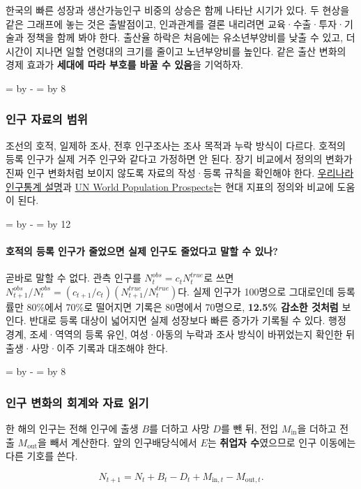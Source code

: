 \documentclass[10pt,a4paper]{article}
\newcommand{\ReserveQuestionSpace}{%
  \par\begingroup
  \dimen0=\pagegoal \advance\dimen0 by -\pagetotal
  \dimen2=\baselineskip \multiply\dimen2 by 12
  \ifdim\dimen0<\dimen2 \newpage\fi
  \endgroup}
\newcommand{\ReserveReadingSectionSpace}{%
  \par\begingroup
  \dimen0=\pagegoal \advance\dimen0 by -\pagetotal
  \dimen2=\baselineskip \multiply\dimen2 by 8
  \ifdim\dimen0<\dimen2 \newpage\fi
  \endgroup}
\begin{document}
한국의 빠른 성장과 생산가능인구 비중의 상승은 함께 나타난 시기가 있다. 두 현상을 같은 그래프에 놓는 것은 출발점이고, 인과관계를 결론 내리려면 교육·수출·투자·기술과 정책을 함께 봐야 한다. 출산율 하락은 처음에는 유소년부양비를 낮출 수 있고, 더 시간이 지나면 일할 연령대의 크기를 줄이고 노년부양비를 높인다. 같은 출산 변화의 경제 효과가 \textbf{세대에 따라 부호를 바꿀 수 있음}을 기억하자.\par

\ReserveReadingSectionSpace
\subsubsection*{인구 자료의 범위}

조선의 호적, 일제하 조사, 전후 인구조사는 조사 목적과 누락 방식이 다르다. 호적의 등록 인구가 실제 거주 인구와 같다고 가정하면 안 된다. 장기 비교에서 정의의 변화가 진짜 인구 변화처럼 보이지 않도록 자료의 작성·등록 규칙을 확인해야 한다. \href{https://kosis.kr/}{우리나라 인구통계 설명}과 \href{https://population.un.org/wpp/}{UN World Population Prospects}는 현대 지표의 정의와 비교에 도움이 된다.\par

\ReserveQuestionSpace
\paragraph{호적의 등록 인구가 줄었으면 실제 인구도 줄었다고 말할 수 있나?}
곧바로 말할 수 없다. 관측 인구를 $N_t^{obs}=c_tN_t^{true}$로 쓰면 $N_{t+1}^{obs}/N_t^{obs}=(c_{t+1}/c_t)(N_{t+1}^{true}/N_t^{true})$다. 실제 인구가 100명으로 그대로인데 등록률만 80\%에서 70\%로 떨어지면 기록은 80명에서 70명으로, \textbf{12.5\% 감소한 것처럼} 보인다. 반대로 등록 대상이 넓어지면 실제 성장보다 빠른 증가가 기록될 수 있다. 행정 경계, 조세·역역의 등록 유인, 여성·아동의 누락과 조사 방식이 바뀌었는지 확인한 뒤 출생·사망·이주 기록과 대조해야 한다.\par

\ReserveReadingSectionSpace
\subsubsection*{인구 변화의 회계와 자료 읽기}

한 해의 인구는 전해 인구에 출생 $B$를 더하고 사망 $D$를 뺀 뒤, 전입 $M_{\mathrm{in}}$을 더하고 전출 $M_{\mathrm{out}}$을 빼서 계산한다. 앞의 인구배당식에서 $E$는 \textbf{취업자 수}였으므로 인구 이동에는 다른 기호를 쓴다.\par

\[
N_{t+1}=N_t+B_t-D_t+M_{\mathrm{in},t}-M_{\mathrm{out},t}.
\]
\end{document}
